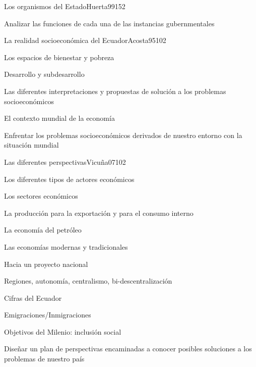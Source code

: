 \begin{syllabus}
\begin{unit}{Los organismos del Estado}{Huerta99}{15}{2}
   \begin{learningoutcomes}
      \item Analizar las funciones de cada una de las instancias gubernmentales
   \end{learningoutcomes}
\end{unit}

\begin{unit}{La realidad socioeconómica del Ecuador}{Acosta95}{10}{2}
   \begin{topics}
      \item Los espacios de bienestar y pobreza
	\item Desarrollo y subdesarrollo
	\item Las diferentes interpretaciones y propuestas de solución a los problemas socioeconómicos
	\item El contexto mundial de la economía
   \end{topics}

   \begin{learningoutcomes}
      \item Enfrentar los problemas socioeconómicos derivados de nuestro entorno con la situación mundial
   \end{learningoutcomes}
\end{unit}

\begin{unit}{Las diferentes perspectivas}{Vicuña07}{10}{2}
   \begin{topics}
      \item Los diferentes tipos de actores económicos
	\item Los sectores económicos
	\item La producción para la exportación y para el consumo interno
	\item La economía del petróleo
	\item Las economías modernas y tradicionales
	\item Hacia un proyecto nacional
	\item Regiones, autonomía, centralismo, bi-descentralización
	\item Cifras del Ecuador
	\item Emigraciones/Inmigraciones
	\item Objetivos del Milenio: inclusión social 
   \end{topics}

   \begin{learningoutcomes}
      \item Diseñar un plan de perspectivas encaminadas a conocer posibles soluciones a los problemas de nuestro país
   \end{learningoutcomes}
\end{unit}

\begin{coursebibliography}
\end{coursebibliography}
\end{syllabus}
